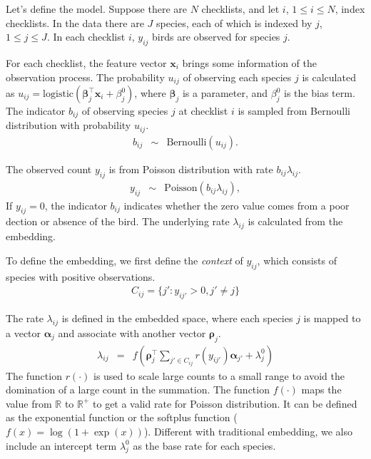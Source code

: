 \documentclass{article}
\newcommand{\wt}{\boldsymbol{\rho}}
\newcommand{\obswt}{\boldsymbol{\beta}}
\newcommand{\emb}{\boldsymbol{\alpha}}
\begin{document}
Let's define the model. Suppose there are $N$ checklists, and let $i$, $1 \le i \le N$, index checklists. In the data there are $J$ species, each of which is indexed by $j$, $1 \le j \le J$. In each checklist $i$, $y_{ij}$ birds are observed for species $j$. 

For each checklist, the feature vector $\mathbf{x}_{i}$ brings some information of the observation process. The probability $u_{ij}$ of observing each species $j$ is calculated as $u_{ij} = \mathrm{logistic}(\obswt_j^\top \mathbf{x}_i + \beta^0_j)$, where $\obswt_j$ is a parameter, and $\beta^0_j$ is the bias term. The indicator $b_{ij}$ of observing species $j$ at checklist $i$ is sampled from Bernoulli distribution with probability $u_{ij}$. 
\begin{eqnarray}
b_{ij} &\sim& \mathrm{Bernoulli}(u_{ij}).
\end{eqnarray}

The observed count $y_{ij}$ is from Poisson distribution with rate $b_{ij}\lambda_{ij}$. 
\begin{eqnarray}
y_{ij} &\sim& \mathrm{Poisson}(b_{ij} \lambda_{ij}),
\end{eqnarray}
If $y_{ij} = 0$, the indicator $b_{ij}$ indicates whether the zero value comes from a poor dection or absence of the bird.
The underlying rate $\lambda_{ij}$ is calculated from the embedding. 

To define the embedding, we first define the {\it context} of $y_{ij}$, which consists of species with positive observations. 
\begin{eqnarray}
C_{ij} = \{j': y_{ij'} > 0, j' \neq j\}
\end{eqnarray}

The rate $\lambda_{ij}$ is defined in the embedded space, where each species $j$ is mapped to a vector $\emb_j$ and associate with another
vector $\wt_j$. 
\begin{eqnarray}
\lambda_{ij} &=& f\left(\wt_{j}^\top \sum_{j' \in C_{ij}} r(y_{ij'}) \emb_{j'} + \lambda^0_{j} \right) \label{lambda_exp} 
\end{eqnarray}
The function $r(\cdot)$ is used to scale large counts to a small range to avoid the domination of a large count in the summation. 
The function $f(\cdot)$ maps the value from $\mathbb{R}$ to $\mathbb{R}^{+}$ to get a valid rate for Poisson distribution. It can 
be defined as the exponential function or the softplus function ($f(x) = \log(1 + \exp(x))$). Different with traditional embedding, 
we also include an intercept term $\lambda^0_{j}$ as the base rate for each species.
\end{document}

